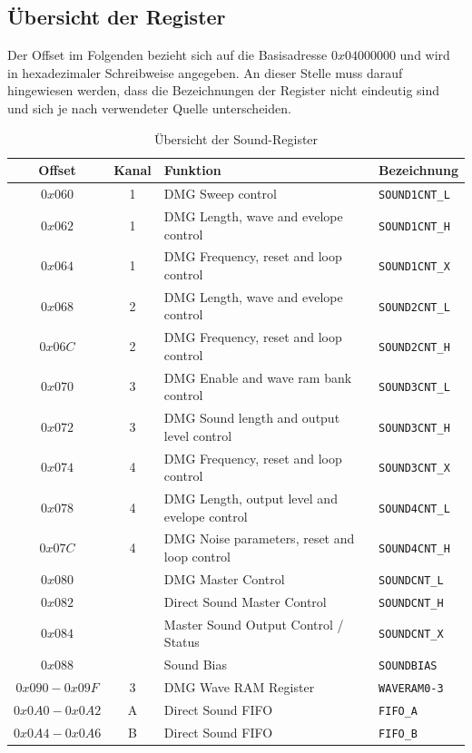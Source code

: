 \documentclass[11pt,a4paper]{scrartcl}
\begin{document}
\subsection{\"Ubersicht der Register}

Der Offset im Folgenden bezieht sich auf die Basisadresse $0x04000000$ und wird in hexadezimaler Schreibweise angegeben. An dieser Stelle muss darauf hingewiesen werden, dass die Bezeichnungen der Register nicht eindeutig sind und sich je nach verwendeter Quelle unterscheiden.

\begin{table}[h]
    \centering
    \begin{tabular}{ c | c | p{10cm} | l }
        \textbf{Offset} & \textbf{Kanal} & \textbf{Funktion} & \textbf{Bezeichnung} \\
        \hline
        $0x060$ & 1 & DMG Sweep control & \verb|SOUND1CNT_L| \\
        \hline
        $0x062$ & 1 & DMG Length, wave and evelope control & \verb|SOUND1CNT_H| \\
        \hline
        $0x064$ & 1 & DMG Frequency, reset and loop control & \verb|SOUND1CNT_X| \\
        \hline
        $0x068$ & 2 & DMG Length, wave and evelope control & \verb|SOUND2CNT_L| \\
        \hline
        $0x06C$ & 2 & DMG Frequency, reset and loop control & \verb|SOUND2CNT_H| \\
        \hline
        $0x070$ & 3 & DMG Enable and wave ram bank control & \verb|SOUND3CNT_L| \\
        \hline
        $0x072$ & 3 & DMG Sound length and output level control & \verb|SOUND3CNT_H| \\
        \hline
        $0x074$ & 4 & DMG Frequency, reset and loop control & \verb|SOUND3CNT_X| \\
        \hline
        $0x078$ & 4 & DMG Length, output level and evelope control & \verb|SOUND4CNT_L| \\
        \hline
        $0x07C$ & 4 & DMG Noise parameters, reset and loop control & \verb|SOUND4CNT_H| \\
        \hline
        $0x080$ & & DMG Master Control & \verb|SOUNDCNT_L| \\
        \hline
        $0x082$ & & Direct Sound Master Control & \verb|SOUNDCNT_H| \\
        \hline
        $0x084$ & & Master Sound Output Control / Status & \verb|SOUNDCNT_X| \\
        \hline
        $0x088$ & & Sound Bias & \verb|SOUNDBIAS| \\
        \hline
        $0x090 - 0x09F$ & 3 & DMG Wave RAM Register & \verb|WAVERAM0-3| \\
        \hline
        $0x0A0 - 0x0A2$ & A & Direct Sound FIFO & \verb|FIFO_A| \\
        \hline
        $0x0A4 - 0x0A6$ & B & Direct Sound FIFO & \verb|FIFO_B| \\
    \end{tabular}
    \caption{\"Ubersicht der Sound-Register}
    \label{table:SoundRegister}
\end{table}
\newpage
\end{document}
